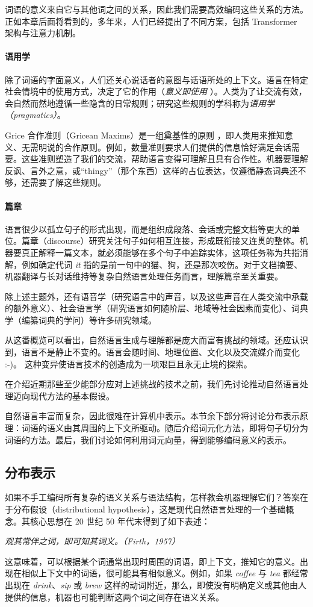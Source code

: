词语的意义来自它与其他词之间的关系，因此我们需要高效编码这些关系的方法。正如本章后面将看到的，多年来，人们已经提出了不同方案，包括 Transformer 架构与注意力机制。

\paragraph{语用学} 除了词语的字面意义，人们还关心说话者的意图与话语所处的上下文。语言在特定社会情境中的使用方式，决定了它的作用（{\em 意义即使用} \citep{baker2008wittgenstein}）。人类为了让交流有效，会自然而然地遵循一些隐含的日常规则；研究这些规则的学科称为{\em 语用学（pragmatics）}。

Grice 合作准则（Gricean Maxims）是一组奠基性的原则 \citep{Grice_1975}，即人类用来推知意义、无需明说的合作原则。例如，数量准则要求人们提供的信息恰好满足会话需要。这些准则塑造了我们的交流，帮助语言变得可理解且具有合作性。机器要理解反讽、言外之意，或“thingy”（那个东西）这样的占位表达，仅遵循静态词典还不够，还需要了解这些规则。

\paragraph{篇章} 语言很少以孤立句子的形式出现，而是组织成段落、会话或完整文档等更大的单位。篇章（discourse）研究关注句子如何相互连接，形成既衔接又连贯的整体。机器要真正解释一篇文本，就必须能够在多个句子中追踪实体，这项任务称为共指消解，例如确定代词 {\em it} 指的是前一句中的猫、狗，还是那次咬伤。对于文档摘要、机器翻译与长对话维持等复杂自然语言处理任务而言，理解篇章至关重要。

除上述主题外，还有语音学（研究语言中的声音，以及这些声音在人类交流中承载的额外意义）、社会语言学（研究语言如何随阶层、地域等社会因素而变化）、词典学（编纂词典的学问）等许多研究领域。

从这番概览可以看出，自然语言生成与理解都是庞大而富有挑战的领域。还应认识到，语言不是静止不变的。语言会随时间、地理位置、文化以及交流媒介而变化 :-)。
这种变异使语言技术的创造成为一项艰巨且永无止境的探索。

在介绍近期那些至少能部分应对上述挑战的技术之前，我们先讨论推动自然语言处理迈向现代方法的基本假设。

自然语言丰富而复杂，因此很难在计算机中表示。本节余下部分将讨论分布表示原理：词语的语义由其周围的上下文所驱动。随后介绍词元化方法，即将句子切分为词语的方法。最后，我们讨论如何利用词元向量，得到能够编码意义的表示。

\subsection{分布表示}
如果不手工编码所有复杂的语义关系与语法结构，怎样教会机器理解它们？答案在于分布假设（distributional hypothesis），这是现代自然语言处理的一个基础概念。其核心思想在 20 世纪 50 年代末得到了如下表述：
\begin{center}
    \emph{观其常伴之词，即可知其词义。（Firth，1957）}
\end{center}
这意味着，可以根据某个词通常出现时周围的词语，即上下文，推知它的意义。出现在相似上下文中的词语，很可能具有相似意义。例如，如果 {\em coffee} 与 {\em tea} 都经常出现在 {\em drink}、{\em sip} 或 {\em brew} 这样的动词附近，那么，即使没有明确定义或其他由人提供的信息，机器也可能判断这两个词之间存在语义关系。

